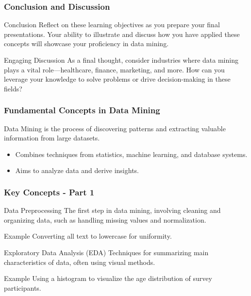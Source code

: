 \documentclass[aspectratio=169]{beamer}
\begin{document}
\begin{frame}[fragile]
    \frametitle{Conclusion and Discussion}
    \begin{block}{Conclusion}
        Reflect on these learning objectives as you prepare your final presentations. Your ability to illustrate and discuss how you have applied these concepts will showcase your proficiency in data mining.
    \end{block}
    \begin{block}{Engaging Discussion}
        As a final thought, consider industries where data mining plays a vital role—healthcare, finance, marketing, and more. How can you leverage your knowledge to solve problems or drive decision-making in these fields?
    \end{block}
\end{frame}

\begin{frame}[fragile]
    \frametitle{Fundamental Concepts in Data Mining}
    Data Mining is the process of discovering patterns and extracting valuable information from large datasets. 
    \begin{itemize}
        \item Combines techniques from statistics, machine learning, and database systems.
        \item Aims to analyze data and derive insights.
    \end{itemize}
\end{frame}

\begin{frame}[fragile]
    \frametitle{Key Concepts - Part 1}
    \begin{block}{Data Preprocessing}
        The first step in data mining, involving cleaning and organizing data, such as handling missing values and normalization.
    \end{block}
    \begin{block}{Example}
        Converting all text to lowercase for uniformity.
    \end{block}
    
    \begin{block}{Exploratory Data Analysis (EDA)}
        Techniques for summarizing main characteristics of data, often using visual methods.
    \end{block}
    \begin{block}{Example}
        Using a histogram to visualize the age distribution of survey participants.
    \end{block}
\end{frame}
\end{document}
